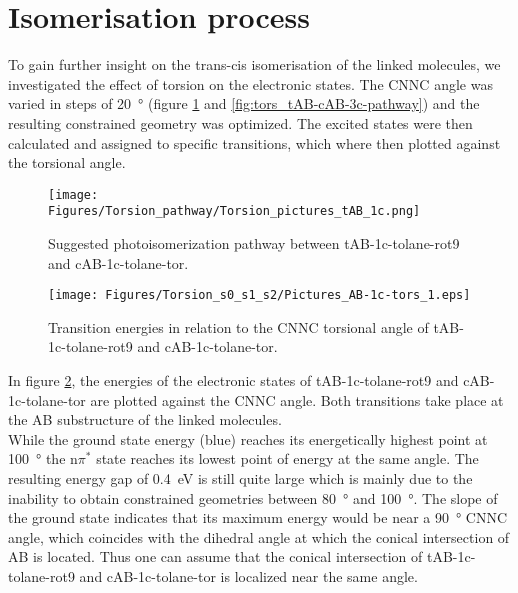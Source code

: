 \section{Isomerisation process}
To gain further insight on the trans-cis isomerisation of the linked molecules, we investigated the effect of torsion on the electronic states. The CNNC angle was varied in steps of \SI{20}{\degree} (figure \ref{fig:tors_tAB-cAB-1c-pathway} and \ref{fig:tors_tAB-cAB-3c-pathway}) and the resulting constrained geometry was optimized. The excited states were then calculated and assigned to specific transitions, which where then plotted against the torsional angle. 
%
%
%
%
\begin{figure}[H]
    \centering
    \texttt{[image: Figures/Torsion\_pathway/Torsion\_pictures\_tAB\_1c.png]}
    \caption{Suggested photoisomerization pathway between tAB-1c-tolane-rot9 and cAB-1c-tolane-tor.}
    \label{fig:tors_tAB-cAB-1c-pathway}
\end{figure}
%
%
\begin{figure}[H]
    \centering
    \texttt{[image: Figures/Torsion\_s0\_s1\_s2/Pictures\_AB-1c-tors\_1.eps]}
    \caption{Transition energies in relation to the CNNC torsional angle of tAB-1c-tolane-rot9 and cAB-1c-tolane-tor.}
    \label{fig:tors_tAB-cAB-1c}
\end{figure}
%
In figure \ref{fig:tors_tAB-cAB-1c}, the energies of the electronic states of tAB-1c-tolane-rot9 and cAB-1c-tolane-tor are plotted against the CNNC angle. Both transitions take place at the AB substructure of the linked molecules. \\
While the ground state energy (blue) reaches its energetically highest point at \SI{100}{\degree} the n$\pi^{*}$ state reaches its lowest point of energy at the same angle. The resulting energy gap of \SI{0.4}{\eV} is still quite large which is mainly due to the inability to obtain constrained geometries between \SI{80}{\degree} and \SI{100}{\degree}. The slope of the ground state indicates that its maximum energy would be near a \SI{90}{\degree} CNNC angle, which coincides with the dihedral angle at which the conical intersection of AB is located.\cite{maximum-con-inter-AB} Thus one can assume that the conical intersection of tAB-1c-tolane-rot9 and cAB-1c-tolane-tor is localized near the same angle. 
%
